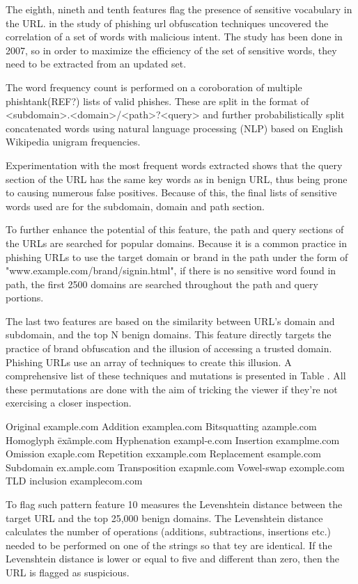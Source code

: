 The eighth, nineth and tenth features flag the presence of sensitive vocabulary in the URL. \cite{10.1145/1314389.1314391} in the study of phishing url obfuscation techniques uncovered the correlation of a set of words with malicious intent. The study has been done in 2007, so in order to maximize the efficiency of the set of sensitive words, they need to be extracted from an updated set.

The word frequency count is performed on a coroboration of multiple phishtank(REF?) lists of valid phishes. These are split in the format of <subdomain>.<domain>/<path>?<query> and further probabilistically split concatenated words using natural language processing (NLP) based on English Wikipedia unigram frequencies.

Experimentation with the most frequent words extracted shows that the query section of the URL has the same key words as in benign URL, thus being prone to causing numerous false positives. Because of this, the final lists of sensitive words used are for the subdomain, domain and path section.

To further enhance the potential of this feature, the path and query sections of the URLs are searched for popular domains. Because it is a common practice in phishing URLs to use the target domain or brand in the path under the form of "www.example.com/brand/signin.html", if there is no sensitive word found in path, the first 2500 domains are searched throughout the path and query portions.

The last two features are based on the similarity between URL's domain and subdomain, and the top N benign domains. This feature directly targets the practice of brand obfuscation and the illusion of accessing a trusted domain.
Phishing URLs use an array of techniques to create this illusion. A comprehensive list of these techniques and mutations is presented in Table . All these permutations are done with the aim of tricking the viewer if they're not exercising a closer inspection. 


Original example.com
Addition examplea.com
Bitsquatting azample.com
Homoglyph ēxãmple.com
Hyphenation exampl-e.com
Insertion examplme.com
Omission exaple.com
Repetition exxample.com
Replacement esample.com
Subdomain ex.ample.com
Transposition exapmle.com
Vowel-swap exomple.com
TLD inclusion examplecom.com

To flag such pattern feature 10 measures the Levenshtein distance between the target URL and the top 25,000 benign domains. The Levenshtein distance calculates the number of operations (additions, subtractions, insertions etc.) needed to be performed on one of the strings so that tey are identical. If the Levenshtein distance is lower or equal to five and different than zero, then the URL is flagged as suspicious.

